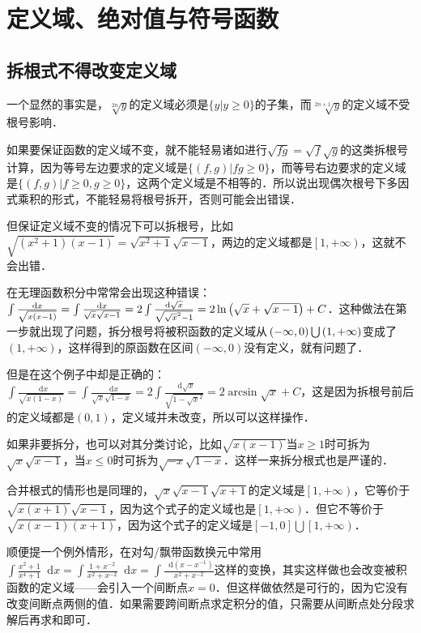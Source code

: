\documentclass{ctexbook}
\newcommand*{\dif}{\mathop{}\!\mathrm{d}}
\begin{document}
\section{定义域、绝对值与符号函数}
\subsection{拆根式不得改变定义域}
一个显然的事实是，$\sqrt[2n]{y}$的定义域必须是$\{y|y\ge0\}$的子集，而$\sqrt[2n+1]{y}$的定义域不受根号影响．\par
如果要保证函数的定义域不变，就不能轻易诸如进行$\sqrt{fg}=\sqrt{f}\sqrt{g}$的这类拆根号计算，因为等号左边要求的定义域是$\{\left(f,g\right)|fg\ge0\}$，而等号右边要求的定义域是$\{\left(f,g\right)|f\ge0,g\ge0\}$，这两个定义域是不相等的．所以说出现偶次根号下多因式乘积的形式，不能轻易将根号拆开，否则可能会出错误．\par
但保证定义域不变的情况下可以拆根号，比如$\sqrt{\left(x^{2}+1\right)\left(x-1\right)}=\sqrt{x^{2}+1}\sqrt{x-1}$，两边的定义域都是$\left[1,+\infty\right)$，这就不会出错．\par
在无理函数积分中常常会出现这种错误：$\int\frac{\dif{x}}{\sqrt{x\left(x-1\right)}}=\int\frac{\dif{x}}{\sqrt{x}\sqrt{x-1}}=2\int\frac{\dif{\sqrt{x}}}{\sqrt{\sqrt{x}^{2}-1}}\\=2\ln{\left(\sqrt{x}+\sqrt{x-1}\right)}+C$．这种做法在第一步就出现了问题，拆分根号将被积函数的定义域从$\\\left(-\infty,0\right)\bigcup\left(1,+\infty\right)$变成了$\left(1,+\infty\right)$，这样得到的原函数在区间$\left(-\infty,0\right)$没有定义，就有问题了．\par
但是在这个例子中却是正确的：$\int\frac{\dif{x}}{\sqrt{x\left(1-x\right)}}=\int\frac{\dif{x}}{\sqrt{x}\sqrt{1-x}}=2\int\frac{\dif{\sqrt{x}}}{\sqrt{1-\sqrt{x}^{2}}}=2\arcsin{\sqrt{x}}+C$，这是因为拆根号前后的定义域都是$\left(0,1\right)$，定义域并未改变，所以可以这样操作．\par
如果非要拆分，也可以对其分类讨论，比如$\sqrt{x\left(x-1\right)}$当$x\ge1$时可拆为$\sqrt{x}\sqrt{x-1}$，当$x\le0$时可拆为$\sqrt{-x}\sqrt{1-x}$．这样一来拆分根式也是严谨的．\par
合并根式的情形也是同理的，$\sqrt{x}\sqrt{x-1}\sqrt{x+1}$的定义域是$\left[1,+\infty\right)$，它等价于$\sqrt{x\left(x+1\right)}\sqrt{x-1}$，因为这个式子的定义域也是$\left[1,+\infty\right)$．但它不等价于$\sqrt{x\left(x-1\right)\left(x+1\right)}$，因为这个式子的定义域是$\left[-1,0\right]\bigcup\left[1,+\infty\right)$．\par
顺便提一个例外情形，在对勾/飘带函数换元中常用$\int\frac{x^{2}+1}{x^{4}+1}\dif{x}=\int\frac{1+x^{-2}}{x^{2}+x^{-2}}\dif{x}=\int\frac{\dif{\left(x-x^{-1}\right)}}{x^{2}+x^{-2}}$这样的变换，其实这样做也会改变被积函数的定义域——会引入一个间断点$x=0$．但这样做依然是可行的，因为它没有改变间断点两侧的值．如果需要跨间断点求定积分的值，只需要从间断点处分段求解后再求和即可．\par
\end{document}
